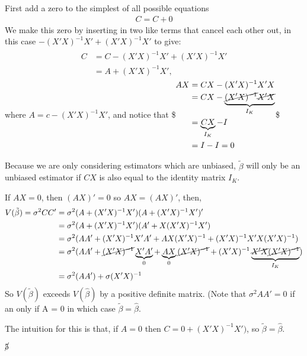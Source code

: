 \documentclass[letterpaper,10pt,english]{jupyterBook}
\begin{document}
First add a zero to the simplest of all possible equations
\begin{equation*}
\begin{split}C = C + 0\end{split}
\end{equation*}
We make this zero by inserting in two like terms that cancel each other
out, in this case \(-(X'X)^{-1}X' + (X'X)^{-1}X'\) to give:
\begin{equation*}
\begin{split}\begin{aligned}
          C &= C -(X'X)^{-1}X' + (X'X)^{-1}X' \\
          &= A + (X'X)^{-1}X',
    \end{aligned}\end{split}
\end{equation*}
where \(A = c - (X'X)^{-1}X'\), and notice that \$\(\begin{aligned}
            AX &= CX - (X'X)^{-1}X'X \\
            &= CX - \underbrace{\cancel{(X'X)^{-1}}\cancel{X'X}}_{I_K} \\
            &= \underbrace{CX}_{I_K} - I\\
            &= I - I = 0
        \end{aligned}\)\$

Because we are only considering estimators which are unbiased,
\(\tilde \beta\) will only be an unbiased estimator if \(CX\) is also equal
to the identity matrix \(I_K\).

If \(AX = 0\), then \((AX)' = 0\) so \(AX = (AX)'\), then,
\begin{equation*}
\begin{split}\begin{aligned}
        V(\tilde\beta) = \sigma^2CC' &= \sigma^2(A + (X'X)^{-1}X')(A + (X'X)^{-1}X')' \\
        &= \sigma^2(A + (X'X)^{-1}X')(A '+ X(X'X)^{-1}X')\\
        &= \sigma^2(AA' + (X'X)^{-1}X'A' + AX(X'X)^{-1} + (X'X)^{-1}X'X(X'X)^{-1}) \\
        &= \sigma^2(AA' + \cancel{(X'X)^{-1}}\underbrace{X'A'}_0 + \underbrace{AX}_{0}\cancel{(X'X)^{-1}} + (X'X)^{-1} \underbrace{\cancel{X'X}\cancel{(X'X)^{-1}}}_{I_K}) \\
        &= \sigma^2(AA') + \sigma(X'X)^{-1} 
    \end{aligned}\end{split}
\end{equation*}
So \(V(\tilde\beta)\) exceeds \(V(\hat\beta)\) by a positive definite
matrix. (Note that \(\sigma^2AA' = 0\) if an only if A = 0 in which case
\(\tilde\beta = \hat\beta\).

The intuition for this is that, if \(A = 0\) then
\(C = 0  + (X'X)^{-1}X')\), so \(\tilde\beta = \hat\beta\).

\(\cancel{5}\)







\renewcommand{\indexname}{Index}
\printindex
\end{document}

